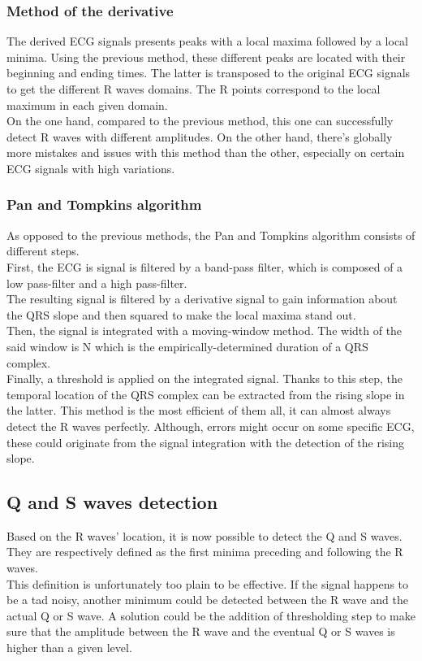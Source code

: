 \documentclass[11pt]{article}
\begin{document}
		\subsubsection{Method of the derivative}
			The derived ECG signals presents peaks with a local maxima followed by a local minima. Using the previous method, these different peaks are located with their beginning and ending times. The latter is transposed to the original ECG signals to get the different R waves domains. The R points correspond to the local maximum in each given domain.\\
			On the one hand, compared to the previous method, this one can successfully detect R waves with different amplitudes. On the other hand, there's globally more mistakes and issues with this method than the other, especially on certain ECG signals with high variations.
		\subsubsection{Pan and Tompkins algorithm}
			As opposed to the previous methods, the Pan and Tompkins algorithm consists of different steps.\\
			First, the ECG is signal is filtered by a band-pass filter, which is composed of a low pass-filter and a high pass-filter.\\
			The resulting signal is filtered by a derivative signal to gain information about the QRS slope and then squared to make the local maxima stand out.\\
			Then, the signal is integrated with a moving-window method. The width of the said window is N which is the empirically-determined duration of a QRS complex.\\
			Finally, a threshold is applied on the integrated signal. Thanks to this step, the temporal location of the QRS complex can be extracted from the rising slope in the latter.
			This method is the most efficient of them all, it can almost always detect the R waves perfectly. Although, errors might occur on some specific ECG, these could originate from the signal integration with the detection of the rising slope.
	\subsection{Q and S waves detection}
		Based on the R waves' location, it is now possible to detect the Q and S waves. They are respectively defined as the first minima preceding and following the R waves.\\
		This definition is unfortunately too plain to be effective. If the signal happens to be a tad noisy, another minimum could be detected between the R wave and the actual Q or S wave. A solution could be the addition of thresholding step to make sure that the amplitude between the R wave and the eventual Q or S waves is higher than a given level.
\end{document}

